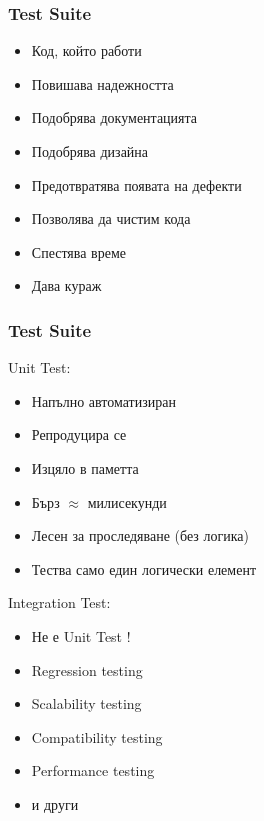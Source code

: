 \begin{frame}
  \frametitle{Test Suite}
  \begin{itemize}
    \item Код, който работи
    \item Повишава надежността 
    \item Подобрява документацията
    \item Подобрява дизайна
    \item Предотвратява появата на дефекти
    \item Позволява да чистим кода
    \item Спестява време
    \item Дава кураж
  \end{itemize}
\end{frame}

\begin{frame}
  \frametitle{Test Suite}
    \begin{minipage}[t]{0.48\linewidth}
        Unit Test:
        \begin{itemize}
          \item Напълно автоматизиран 
          \item Репродуцира се 
          \item Изцяло в паметта
          \item Бърз $\approx$ милисекунди 
          \item Лесен за проследяване (без логика) 
          \item Тества само един логически елемент 
        \end{itemize}
    \end{minipage}\hfill
    \begin{minipage}[t]{0.48\linewidth}
        Integration Test:
        \begin{itemize}
          \item Не е Unit Test !
          \item Regression testing
          \item Scalability testing
          \item Compatibility testing
          \item Performance testing
          \item и други
        \end{itemize}
    \end{minipage}
\end{frame}

